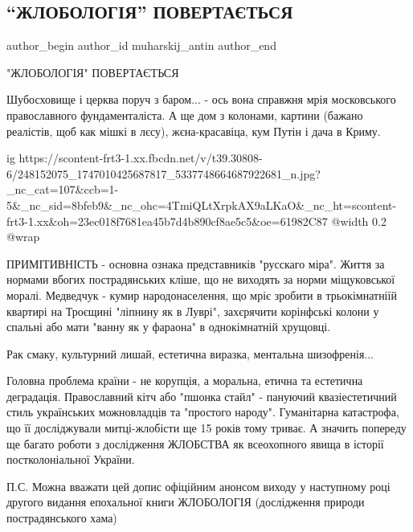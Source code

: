 
 
 
 
 
 
\subsection{\enquote{ЖЛОБОЛОГІЯ} ПОВЕРТАЄТЬСЯ}
\label{sec:12_11_2021.fb.muharskij_antin.1.zhlobologia_vozvraschaetsja}
 
\ifcmt
 author_begin
   author_id muharskij_antin
 author_end
\fi

"ЖЛОБОЛОГІЯ" ПОВЕРТАЄТЬСЯ

Шубосховище і церква поруч з баром... - ось вона справжня мрія московського
православного фундаменталіста.  А ще дом з колонами, картини  (бажано
реалістів, щоб как мішкі в лєсу), жєна-красавіца, кум Путін і дача в Криму. 

\ifcmt
  ig https://scontent-frt3-1.xx.fbcdn.net/v/t39.30808-6/248152075_1747010425687817_5337748664687922681_n.jpg?_nc_cat=107&ccb=1-5&_nc_sid=8bfeb9&_nc_ohc=4TmiQLtXrpkAX9aLKaO&_nc_ht=scontent-frt3-1.xx&oh=23ec018f7681ea45b7d4b890cf8ae5c5&oe=61982C87
  @width 0.2
  @wrap 
\fi

ПРИМІТИВНІСТЬ - основна ознака представників "русскаго міра". Життя за нормами
вбогих пострадянських кліше, що не виходять за норми міщуковської моралі.
Медведчук - кумир народонаселення, що мріє  зробити в трьокімнатніїй квартирі
на Троєщині "ліпнину як в Луврі",  захєрячити корінфські колони у спальні або
мати  "ванну як у фараона" в однокімнатній хрущовці.

Рак смаку, культурний лишай, естетична виразка, ментальна шизофренія...

Головна проблема країни - не корупція, а моральна, етична та естетична
деградація. Православний кітч або "пшонка стайл" - пануючий квазіестетичний
стиль українських можновладців та "простого народу". Гуманітарна катастрофа, що
її  досліджували митці-жлобісти ще 15 років тому триває. А значить попереду  ще
багато роботи з дослідження ЖЛОБСТВА як всеохопного явища в історії
постколоніальної України.

П.С. Можна вважати цей допис офіційним анонсом виходу у наступному році другого
видання епохальної книги ЖЛОБОЛОГІЯ (дослідження природи пострадянського хама)
